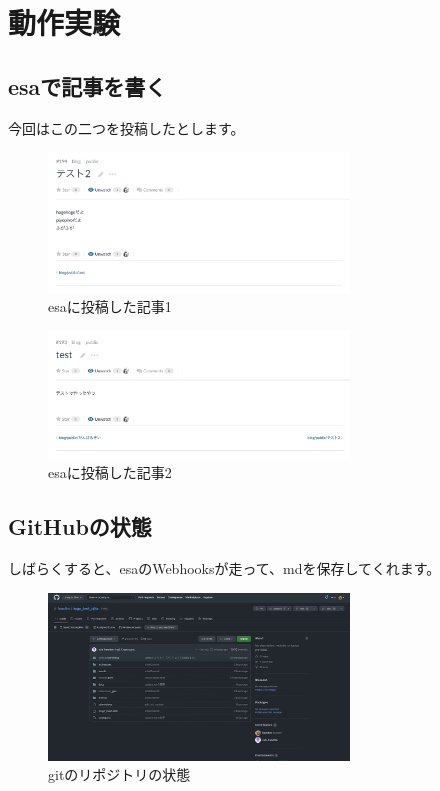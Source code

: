 \chapter{動作実験}

\section{esaで記事を書く}
  今回はこの二つを投稿したとします。

  \begin{figure}[H]
    \centering
    \includegraphics[width=8cm]{./image/02-chap9/esa-post-1.png}
    \caption{esaに投稿した記事1}
    \label{chap9-esa-post-1-image}
  \end{figure}

  \begin{figure}[H]
    \centering
    \includegraphics[width=8cm]{./image/02-chap9/esa-post-2.png}
    \caption{esaに投稿した記事2}
    \label{chap9-esa-post-2-image}
  \end{figure}

\section{GitHubの状態}

  しばらくすると、esaのWebhooksが走って、mdを保存してくれます。

  \begin{figure}[H]
    \centering
    \includegraphics[width=8cm]{./image/02-chap9/git-repo.png}
    \caption{gitのリポジトリの状態}
    \label{chap9-git-repo-image}
  \end{figure}

